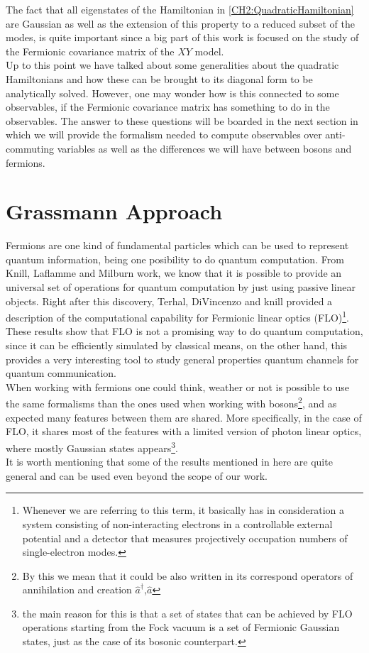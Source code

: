 \newline 
The fact that all eigenstates of the Hamiltonian in \eqref{CH2:QuadraticHamiltonian} are Gaussian as well as the extension of this property to a reduced subset of the modes, is quite important since a big part of this work is focused on the study of the Fermionic covariance matrix of the $XY$ model.\\
Up to this point we have talked about some generalities about the quadratic Hamiltonians and how these can be brought to its diagonal form to be analytically solved. However, one may wonder how is this connected to some observables, if the Fermionic covariance matrix has something to do in the observables. The answer to these questions will be boarded in the next section in which we will provide the formalism needed to compute observables over anti-commuting variables as well as the differences we will have between bosons and fermions.
\section{Grassmann Approach}
Fermions are one kind of fundamental particles which can be used to represent quantum information, being one posibility to do quantum computation. From Knill, Laflamme and Milburn\cite{knill_scheme_2001} work, we know that it is possible to provide an universal set of operations for quantum computation by just using passive linear objects. Right after this discovery, Terhal, DiVincenzo\cite{terhal_classical_2002} and knill\cite{knill_fermionic_2001} provided a description of the computational capability for Fermionic linear optics (FLO)\footnote{Whenever we are referring to this term, it basically has in consideration a system consisting of non-interacting electrons in a controllable external potential and a detector that measures projectively occupation numbers of single-electron modes.}. These results show that FLO is not a promising way to do quantum computation, since it can be efficiently simulated by classical means, on the other hand, this provides a very interesting tool to study general properties quantum channels for quantum communication.\\
When working with fermions one could think, weather or not is possible to use the same formalisms than the ones used when working with bosons\footnote{By this we mean that it could be also written in its correspond operators of annihilation and creation $\hat{a}^{\dagger}$,$\hat{a}$\cite{noauthor_density_2007}}, and as expected many features between them are shared. More specifically, in the case of FLO, it shares most of the features with a limited version of photon linear optics, where mostly Gaussian states appears\cite{knill_scheme_2001}\footnote{the main reason for this is that a set of states that can be achieved by FLO operations starting from the Fock vacuum is a set of Fermionic Gaussian states, just as the case of its bosonic counterpart.}.\\
It is worth mentioning that some of the results mentioned in here are quite general and can be used even beyond the scope of our work.




